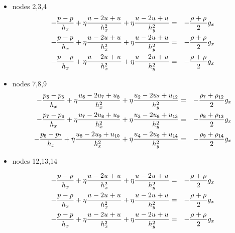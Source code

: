 \begin{itemize}
\item nodes 2,3,4
\begin{eqnarray}
-\frac{p_{\tt }-p_{\tt }}{h_x}       
+\eta \frac{u_{\tt } -2u_{\tt }+u_{\tt }}{h_x^2}  
+\eta \frac{u_{\tt }-2u_{\tt }+u_{\tt }}{h_y^2}  
&=& - \frac{\rho_{\tt } + \rho_{\tt }}{2} g_x  
\\
-\frac{p_{\tt }-p_{\tt }}{h_x}       
+\eta \frac{u_{\tt } -2u_{\tt }+u_{\tt }}{h_x^2}  
+\eta \frac{u_{\tt }-2u_{\tt }+u_{\tt }}{h_y^2}  
&=& - \frac{\rho_{\tt } + \rho_{\tt }}{2} g_x  
\\
-\frac{p_{\tt }-p_{\tt }}{h_x}       
+\eta \frac{u_{\tt } -2u_{\tt }+u_{\tt }}{h_x^2}  
+\eta \frac{u_{\tt }-2u_{\tt }+u_{\tt }}{h_y^2}  
&=& - \frac{\rho_{\tt } + \rho_{\tt }}{2} g_x  
\end{eqnarray}



\item nodes 7,8,9
\begin{eqnarray}
-\frac{p_{\tt 6}-p_{\tt 5}}{h_x}       
+\eta \frac{u_{\tt 6} -2u_{\tt 7}+u_{\tt 8}}{h_x^2}  
+\eta \frac{u_{\tt 2}-2u_{\tt 7}+u_{\tt 12}}{h_y^2}  
&=& - \frac{\rho_{\tt 7} + \rho_{\tt 12}}{2} g_x  
\\
-\frac{p_{\tt 7}-p_{\tt 6}}{h_x}       
+\eta \frac{u_{\tt 7} -2u_{\tt 8}+u_{\tt 9}}{h_x^2}  
+\eta \frac{u_{\tt 3}-2u_{\tt 8}+u_{\tt 13}}{h_y^2}  
&=& - \frac{\rho_{\tt 8} + \rho_{\tt 13}}{2} g_x  
\\
-\frac{p_{\tt 8}-p_{\tt 7}}{h_x}       
+\eta \frac{u_{\tt 8} -2u_{\tt 9}+u_{\tt 10}}{h_x^2}  
+\eta \frac{u_{\tt 4}-2u_{\tt 9}+u_{\tt 14}}{h_y^2}  
&=& - \frac{\rho_{\tt 9} + \rho_{\tt 14}}{2} g_x  
\end{eqnarray}


\item nodes 12,13,14

\begin{eqnarray}
-\frac{p_{\tt }-p_{\tt }}{h_x}       
+\eta \frac{u_{\tt } -2u_{\tt }+u_{\tt }}{h_x^2}  
+\eta \frac{u_{\tt }-2u_{\tt }+u_{\tt }}{h_y^2}  
&=& - \frac{\rho_{\tt } + \rho_{\tt }}{2} g_x  
\\
-\frac{p_{\tt }-p_{\tt }}{h_x}       
+\eta \frac{u_{\tt } -2u_{\tt }+u_{\tt }}{h_x^2}  
+\eta \frac{u_{\tt }-2u_{\tt }+u_{\tt }}{h_y^2}  
&=& - \frac{\rho_{\tt } + \rho_{\tt }}{2} g_x  
\\
-\frac{p_{\tt }-p_{\tt }}{h_x}       
+\eta \frac{u_{\tt } -2u_{\tt }+u_{\tt }}{h_x^2}  
+\eta \frac{u_{\tt }-2u_{\tt }+u_{\tt }}{h_y^2}  
&=& - \frac{\rho_{\tt } + \rho_{\tt }}{2} g_x  
\end{eqnarray}


\end{itemize}


